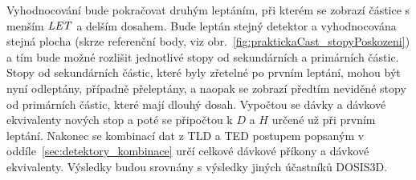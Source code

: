 Vyhodnocování bude pokračovat druhým leptáním, při kterém se zobrazí částice s menším $\mathit{LET}$ a delším dosahem. Bude leptán stejný detektor a vyhodnocována stejná plocha (skrze referenční body, viz obr.~\ref{fig:praktickaCast_stopyPoskozeni}) a tím bude možné rozlišit jednotlivé stopy od sekundárních a primárních částic. Stopy od sekundárních částic, které byly zřetelné po prvním leptání, mohou být nyní odleptány, případně přeleptány, a naopak se zobrazí předtím neviděné stopy od primárních částic, které mají dlouhý dosah. Vypočtou se dávky a dávkové ekvivalenty nových stop a poté se připočtou k $D$ a $H$ určené už při prvním leptání. Nakonec se kombinací dat z TLD a TED postupem popsaným v oddíle~\ref{sec:detektory_kombinace} určí celkové dávkové příkony a dávkové
ekvivalenty. Výsledky budou srovnány s výsledky jiných účastníků DOSIS3D.

